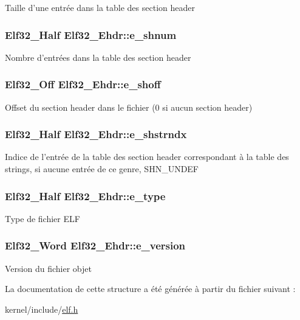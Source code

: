 Taille d'une entrée dans la table des section header \hypertarget{structElf32__Ehdr_a11249bd7e61642742a68a3e7f69ac721}{
\subsubsection[{e\-\_\-shnum}]{\setlength{\rightskip}{0pt plus 5cm}Elf32\-\_\-\-Half Elf32\-\_\-\-Ehdr\-::e\-\_\-shnum}}\label{structElf32__Ehdr_a11249bd7e61642742a68a3e7f69ac721}
Nombre d'entrées dans la table des section header \hypertarget{structElf32__Ehdr_a00601af5187a1b3f8babfe9cddd95c15}{
\subsubsection[{e\-\_\-shoff}]{\setlength{\rightskip}{0pt plus 5cm}Elf32\-\_\-\-Off Elf32\-\_\-\-Ehdr\-::e\-\_\-shoff}}\label{structElf32__Ehdr_a00601af5187a1b3f8babfe9cddd95c15}
Offset du section header dans le fichier (0 si aucun section header) \hypertarget{structElf32__Ehdr_a3b3070ccd7d971e8cb6ea58d4c6fab09}{
\subsubsection[{e\-\_\-shstrndx}]{\setlength{\rightskip}{0pt plus 5cm}Elf32\-\_\-\-Half Elf32\-\_\-\-Ehdr\-::e\-\_\-shstrndx}}\label{structElf32__Ehdr_a3b3070ccd7d971e8cb6ea58d4c6fab09}
Indice de l'entrée de la table des section header correspondant à la table des strings, si aucune entrée de ce genre, S\-H\-N\-\_\-\-U\-N\-D\-E\-F \hypertarget{structElf32__Ehdr_a49e40a791813c06e3b6ebcb53aef1bb8}{
\subsubsection[{e\-\_\-type}]{\setlength{\rightskip}{0pt plus 5cm}Elf32\-\_\-\-Half Elf32\-\_\-\-Ehdr\-::e\-\_\-type}}\label{structElf32__Ehdr_a49e40a791813c06e3b6ebcb53aef1bb8}
Type de fichier E\-L\-F \hypertarget{structElf32__Ehdr_aa27627bda53281221325df4dd782e800}{
\subsubsection[{e\-\_\-version}]{\setlength{\rightskip}{0pt plus 5cm}Elf32\-\_\-\-Word Elf32\-\_\-\-Ehdr\-::e\-\_\-version}}\label{structElf32__Ehdr_aa27627bda53281221325df4dd782e800}
Version du fichier objet 

La documentation de cette structure a été générée à partir du fichier suivant \-:\begin{DoxyCompactItemize}
\item 
kernel/include/\hyperlink{elf_8h}{elf.\-h}\end{DoxyCompactItemize}
